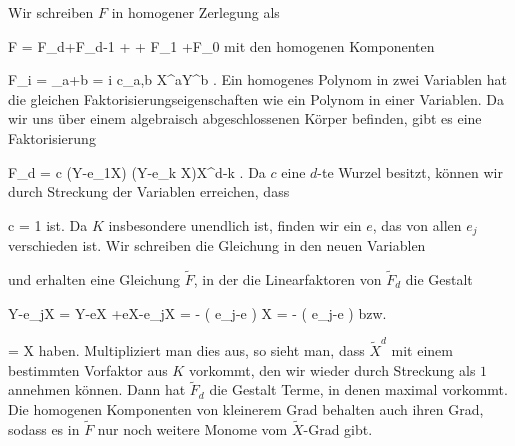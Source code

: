 {





Wir schreiben $F$ in homogener Zerlegung als

\mavergleichskettedisp
{\vergleichskette
{ F
}
{ =} { F_d+F_{d-1} + \cdots + F_1 +F_0
}
{ } {
}
{ } {
}
{ } {
}
}
{}{}{}
mit den homogenen Komponenten

\mavergleichskettedisp
{\vergleichskette
{ F_i
}
{ =} { \sum_{a+b = i}  c_{a,b} X^{a}Y^{b}
}
{ } {
}
{ } {
}
{ } {
}
}
{}{}{.}
Ein homogenes Polynom in zwei Variablen hat die gleichen Faktorisierungseigenschaften wie ein Polynom in einer Variablen. Da wir uns über einem algebraisch abgeschlossenen Körper befinden, gibt es eine Faktorisierung

\mavergleichskettedisp
{\vergleichskette
{ F_d
}
{ =} { c (Y-e_1X) \cdots (Y-e_k X)X^{d-k}
}
{ } {
}
{ } {
}
{ } {
}
}
{}{}{.}
Da $c$ eine $d$-te Wurzel besitzt, können wir durch Streckung der Variablen erreichen, dass

\mavergleichskette
{\vergleichskette
{ c
}
{ = }{ 1
}
{  }{
}
{    }{
}
{   }{
}
}
{}{}{}
ist. Da $K$ insbesondere unendlich ist, finden wir ein $e$, das von allen $e_j$ verschieden ist. Wir schreiben die Gleichung in den neuen Variablen

 {  }

und erhalten eine Gleichung $\tilde{F}$, in der die Linearfaktoren von $\tilde{F}_d$ die Gestalt

\mavergleichskettealign
{\vergleichskettealign
{ Y-e_jX
}
{ =} { Y-eX +eX-e_jX
}
{ =} { - \left(  e_j-e  \right) X
}
{ =} {  -  \left(  e_j-e  \right) 
}
{ } {
}
}
{}
{}{}
 {} {}
bzw.

\mavergleichskette
{\vergleichskette
{ 
}
{ = }{ X
}
{  }{
}
{    }{
}
{   }{
}
}
{}{}{}
haben. Multipliziert man dies aus, so sieht man, dass $\tilde{X}^d$ mit einem bestimmten Vorfaktor aus $K$ vorkommt, den wir wieder durch Streckung als $1$ annehmen können. Dann hat $\tilde{F}_d$ die Gestalt
 Terme, in denen maximal
 vorkommt. Die homogenen Komponenten von kleinerem Grad behalten auch ihren Grad, sodass es in $\tilde{F}$ nur noch weitere Monome vom $\tilde{X}$-Grad
 gibt.




}






